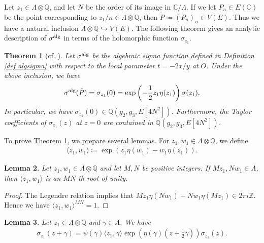 \documentclass[11pt]{amsart}
\newtheorem{thm}{Theorem}[section]
\newtheorem{lem}[thm]{Lemma}
\theoremstyle{definition}
\begin{document}
Let $z_1 \in \Lambda \otimes \mathbb{Q}$, and let $N$ be the order of its image in 
$\mathbb{C}/\Lambda$.
If we let $P_n \in E(\mathbb{C})$ be the point corresponding to $z_1/n \in \Lambda \otimes \mathbb{Q}$, then $\tilde{P} \coloneqq (P_n)_n \in V(E)$. Thus we have a natural inclusion $\Lambda \otimes \mathbb{Q} \hookrightarrow V(E)$. 
The following theorem gives an analytic description of $\sigma^{\rm alg}$ in terms of the holomorphic function $\sigma_{z_1}$.

\begin{thm}[cf. {\cite[Theorem 2.13]{BK10}}]\label{an desc}
Let $\sigma^{\rm alg}$ be the algebraic sigma function defined in Definition \ref{def algsigma} with respect to the local parameter $t=-2x/y$ at $O$.
Under the above inclusion, we have
%
\begin{align*}
\sigma^{\rm alg}(\tilde{P})=\sigma_{z_1}(0)=\exp \left(-\frac{1}{2}z_1\eta(z_1)\right)\sigma(z_1).
\end{align*}
%
In particular, we have $\sigma_{z_1}(0) \in \mathbb{Q}(g_2, g_3, E[4N^2])$. 
Furthermore, the Taylor coefficients of $\sigma_{z_1}(z)$ at $z=0$ are contained in $\mathbb{Q}(g_2, g_3, E[4N^2])$.
\end{thm}

To prove Theorem \ref{an desc}, we prepare several lemmas. 
For $z_1, w_1 \in \Lambda \otimes \mathbb{Q}$, we define
%
\begin{align*}
\langle z_1, w_1 \rangle \coloneqq \exp \left(z_1 \eta(w_1)-w_1 \eta(z_1)\right).
\end{align*}
%

\begin{lem}\label{rootlem}
Let $z_1, w_1 \in \Lambda \otimes \mathbb{Q}$ and let $M, N$ be positive integers. If $Mz_1, Nw_1 \in \Lambda$, then $\langle z_1, w_1 \rangle$ is an $MN$-th root of unity.
\end{lem}

\begin{proof}
The Legendre relation \cite[I Proposition 5.2(d)]{ATAEC} implies that $Mz_1 \eta(Nw_1)-Nw_1 \eta(Mz_1) \in 2\pi i \mathbb{Z}$. Hence we have $\langle z_1, w_1 \rangle^{MN}=1$.
\end{proof}

\begin{lem}\label{transWt}
Let $z_1 \in \Lambda \otimes \mathbb{Q}$ and $\gamma \in \Lambda$.
We have
%
\begin{align*}
\sigma_{z_1}(z+\gamma)=\psi(\gamma) \langle z_1, \gamma \rangle \exp \left(\eta(\gamma)\left(z+\frac{1}{2}\gamma\right)\right)\sigma_{z_1}(z).
\end{align*}
%
\end{lem}
\end{document}
